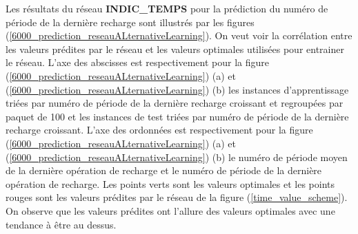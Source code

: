 Les résultats du réseau \textbf{INDIC\_TEMPS} pour la prédiction du numéro de période de la dernière recharge sont illustrés par les figures  (\ref{6000_prediction_reseauALternativeLearning}). On veut voir la corrélation entre les valeurs prédites par le réseau et les valeurs optimales utilisées pour entrainer le réseau. L'axe des abscisses est respectivement pour la figure (\ref{6000_prediction_reseauALternativeLearning}) (a) et (\ref{6000_prediction_reseauALternativeLearning}) (b) les instances d'apprentissage triées par numéro de période de la dernière recharge croissant et regroupées par paquet de 100 et les instances de test triées par numéro de période de la dernière recharge croissant. L'axe des ordonnées est respectivement pour la figure (\ref{6000_prediction_reseauALternativeLearning}) (a) et (\ref{6000_prediction_reseauALternativeLearning}) (b) le numéro de période  moyen de la dernière opération de recharge et le numéro de période de la dernière opération de recharge. Les points verts sont les valeurs optimales et les points rouges sont les valeurs prédites par le réseau de la figure (\ref{time_value_scheme}). On observe que les valeurs prédites ont l'allure des valeurs optimales avec une tendance à être au dessus.





